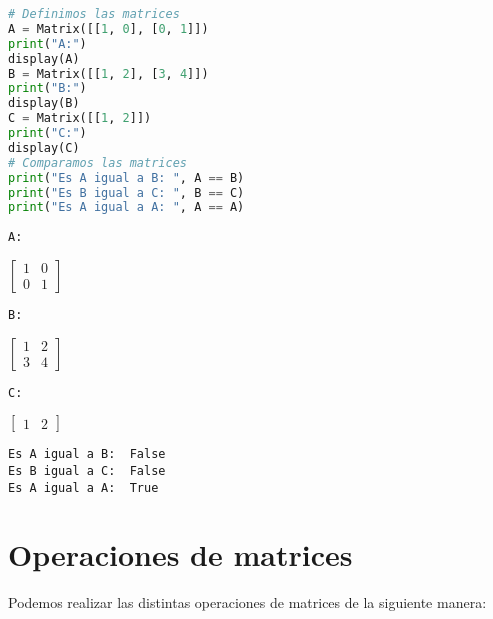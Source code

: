 \documentclass[a4,11pt]{aleph-notas}
\begin{document}
\begin{pycodigo}
    \begin{ipynbcodigo}\begin{lstlisting}[language=Python]
# Definimos las matrices
A = Matrix([[1, 0], [0, 1]])
print("A:")
display(A)
B = Matrix([[1, 2], [3, 4]])
print("B:")
display(B)
C = Matrix([[1, 2]])
print("C:")
display(C)
# Comparamos las matrices
print("Es A igual a B: ", A == B)
print("Es B igual a C: ", B == C)
print("Es A igual a A: ", A == A)
    \end{lstlisting}\end{ipynbcodigo}
    \begin{ipynbsalida}
    \begin{Verbatim}
A:
    \end{Verbatim}
    $\displaystyle \left[\begin{matrix}1 & 0\\0 & 1\end{matrix}\right]$
    \begin{Verbatim}
B:
    \end{Verbatim}
    $\displaystyle \left[\begin{matrix}1 & 2\\3 & 4\end{matrix}\right]$
    \begin{Verbatim}
C:
    \end{Verbatim}
    $\displaystyle \left[\begin{matrix}1 & 2\end{matrix}\right]$
    \begin{Verbatim}
Es A igual a B:  False
Es B igual a C:  False
Es A igual a A:  True
    \end{Verbatim}
    \end{ipynbsalida}
\end{pycodigo}

\section{Operaciones de matrices}

Podemos realizar las distintas operaciones de matrices de la siguiente manera:
\end{document}
